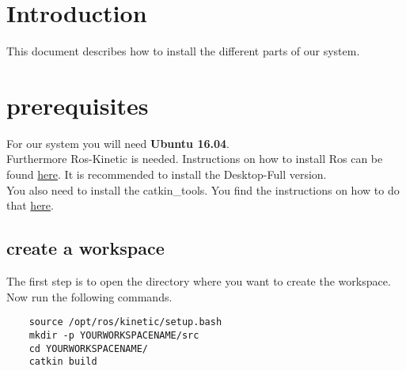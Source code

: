 \documentclass[main.tex]{subfiles}
\begin{document}
\newpage
	\section{Introduction}
	This document describes how to install the different parts of our system.
	
	\section{prerequisites}
	
	For our system you will need \textbf{Ubuntu 16.04}.\\
	Furthermore Ros-Kinetic is needed. Instructions on how to install Ros can be found \href{http://wiki.ros.org/kinetic/Installation/Ubuntu}{here}. It is recommended to install the Desktop-Full version.\\
	You also need to install the catkin\_tools. You find the instructions on how to do that \href{https://catkin-tools.readthedocs.io/en/latest/installing.html}{here}.\\
	\subsection{create a workspace}
	The first step is to open the directory where you want to create the workspace.\\
	Now run the following commands.
	\begin{lstlisting}
	source /opt/ros/kinetic/setup.bash
	mkdir -p YOURWORKSPACENAME/src
	cd YOURWORKSPACENAME/
	catkin build 
	\end{lstlisting}
	
\end{document}
